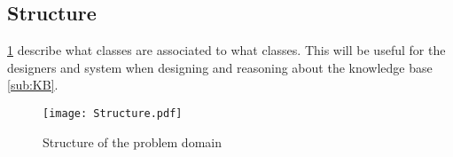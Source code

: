 \subsection{Structure}\label{sub:structure}

\cref{fig:structure} describe what classes are associated to what classes. This will be useful for the designers and system when designing and reasoning about the knowledge base \cref{sub:KB}.

\begin{figure}
  \label{fig:structure}
  \centering
  \begin{adjustbox}{max width=\textwidth}
    \texttt{[image: Structure.pdf]}
  \end{adjustbox}
  \caption{Structure of the problem domain}
\end{figure}
